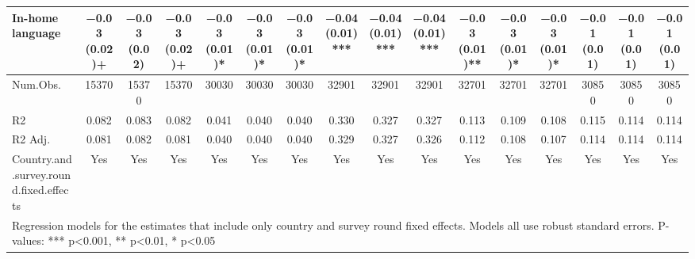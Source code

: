 \begin{table}
\begin{tabular}[t]{lccccccccccccccc}
In-home language & \num{-0.03} (\num{0.02})+ & \num{-0.03} (\num{0.02}) & \num{-0.03} (\num{0.02})+ & \num{-0.03} (\num{0.01})* & \num{-0.03} (\num{0.01})* & \num{-0.03} (\num{0.01})* & \num{-0.04} (\num{0.01})*** & \num{-0.04} (\num{0.01})*** & \num{-0.04} (\num{0.01})*** & \num{-0.03} (\num{0.01})** & \num{-0.03} (\num{0.01})* & \num{-0.03} (\num{0.01})* & \num{-0.01} (\num{0.01}) & \num{-0.01} (\num{0.01}) & \num{-0.01} (\num{0.01})\\
\midrule
Num.Obs. & \num{15370} & \num{15370} & \num{15370} & \num{30030} & \num{30030} & \num{30030} & \num{32901} & \num{32901} & \num{32901} & \num{32701} & \num{32701} & \num{32701} & \num{30850} & \num{30850} & \num{30850}\\
R2 & \num{0.082} & \num{0.083} & \num{0.082} & \num{0.041} & \num{0.040} & \num{0.040} & \num{0.330} & \num{0.327} & \num{0.327} & \num{0.113} & \num{0.109} & \num{0.108} & \num{0.115} & \num{0.114} & \num{0.114}\\
R2 Adj. & \num{0.081} & \num{0.082} & \num{0.081} & \num{0.040} & \num{0.040} & \num{0.040} & \num{0.329} & \num{0.327} & \num{0.326} & \num{0.112} & \num{0.108} & \num{0.107} & \num{0.114} & \num{0.114} & \num{0.114}\\
Country.and.survey.round.fixed.effects & Yes & Yes & Yes & Yes & Yes & Yes & Yes & Yes & Yes & Yes & Yes & Yes & Yes & Yes & Yes\\
\bottomrule
\multicolumn{16}{l}{\rule{0pt}{1em}Regression models for the estimates that include only country and survey round fixed effects. Models all use robust standard errors. P-values: *** p<0.001, ** p<0.01, * p<0.05}\\
\end{tabular}
\end{table}
